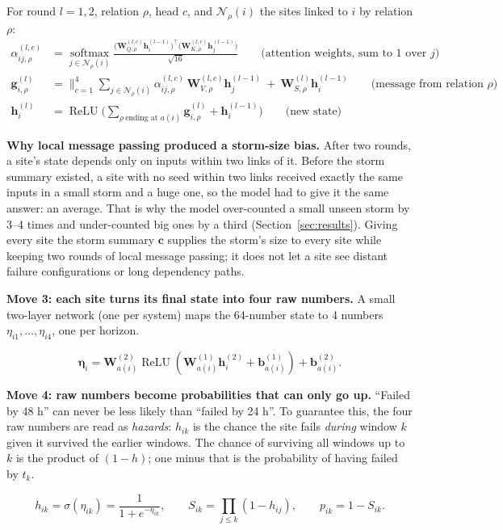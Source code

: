 \documentclass[11pt]{article}
\begin{document}
\begin{maths}
For round $l=1,2$, relation $\rho$, head $c$, and $\mathcal N_\rho(i)$ the sites linked to $i$ by relation $\rho$:
\begin{align*}
\alpha^{(l,c)}_{ij,\rho}&=\operatorname*{softmax}_{j\in\mathcal N_\rho(i)}\frac{\big(\mathbf W^{(l,c)}_{Q,\rho}\mathbf h^{(l-1)}_i\big)^{\!\top}\big(\mathbf W^{(l,c)}_{K,\rho}\mathbf h^{(l-1)}_j\big)}{\sqrt{16}}
\qquad\text{(attention weights, sum to 1 over } j\text{)}\\
\mathbf g^{(l)}_{i,\rho}&=\Big\|_{c=1}^{4}\sum_{j\in\mathcal N_\rho(i)}\alpha^{(l,c)}_{ij,\rho}\,\mathbf W^{(l,c)}_{V,\rho}\mathbf h^{(l-1)}_j\ +\ \mathbf W^{(l)}_{S,\rho}\mathbf h^{(l-1)}_i
\qquad\text{(message from relation }\rho\text{)}\\
\mathbf h^{(l)}_i&=\operatorname{ReLU}\!\Big(\sum_{\rho\ \text{ending at } a(i)}\mathbf g^{(l)}_{i,\rho}+\mathbf h^{(l-1)}_i\Big)
\qquad\text{(new state)}
\end{align*}
\end{maths}

\textbf{Why local message passing produced a storm-size bias.} After two rounds, a site's state depends only on inputs within two links of it. Before the storm summary existed, a site with no seed within two links received exactly the same inputs in a small storm and a huge one, so the model had to give it the same answer: an average. That is why the model over-counted a small unseen storm by 3--4 times and under-counted big ones by a third (Section~\ref{sec:results}). Giving every site the storm summary $\mathbf c$ supplies the storm's size to every site while keeping two rounds of local message passing; it does not let a site see distant failure configurations or long dependency paths.

\textbf{Move 3: each site turns its final state into four raw numbers.} A small two-layer network (one per system) maps the 64-number state to 4 numbers $\eta_{i1},\dots,\eta_{i4}$, one per horizon.
\begin{maths}
\[
\bm\eta_i=\mathbf W^{(2)}_{a(i)}\operatorname{ReLU}\!\left(\mathbf W^{(1)}_{a(i)}\mathbf h^{(2)}_i+\mathbf b^{(1)}_{a(i)}\right)+\mathbf b^{(2)}_{a(i)} .
\]
\end{maths}

\textbf{Move 4: raw numbers become probabilities that can only go up.} ``Failed by 48 h'' can never be less likely than ``failed by 24 h''. To guarantee this, the four raw numbers are read as \emph{hazards}: $h_{ik}$ is the chance the site fails \emph{during} window $k$ given it survived the earlier windows. The chance of surviving all windows up to $k$ is the product of $(1-h)$; one minus that is the probability of having failed by $t_k$.
\begin{maths}
\[
h_{ik}=\sigma(\eta_{ik})=\frac{1}{1+e^{-\eta_{ik}}},\qquad S_{ik}=\prod_{j\le k}(1-h_{ij}),\qquad p_{ik}=1-S_{ik}.
\]
\end{maths}
\end{document}
